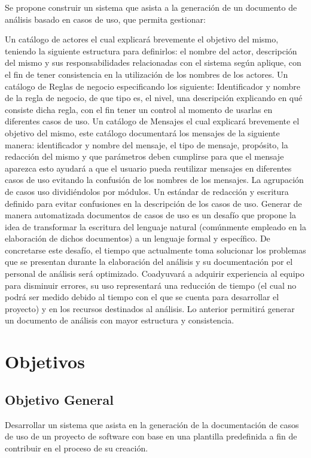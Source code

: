 	Se propone construir un sistema que asista a la generación de un documento de análisis basado en casos de uso,  que permita gestionar:
	
	Un catálogo de actores el cual explicará brevemente el objetivo del mismo, teniendo la siguiente estructura para definirlos: el nombre del actor, descripción del mismo y sus responsabilidades relacionadas con el sistema según aplique, con el fin de tener consistencia en la utilización de los nombres de los actores.
	Un catálogo de Reglas de negocio especificando los siguiente: Identificador y nombre de la regla de negocio, de que tipo es, el nivel, una descripción explicando en qué consiste dicha regla, con el fin tener un control al momento de usarlas en diferentes casos de uso.
	Un catálogo de Mensajes el cual explicará brevemente el objetivo del mismo, este catálogo documentará los mensajes de la siguiente manera: identificador y nombre del mensaje, el tipo de mensaje, propósito, la redacción del mismo y que parámetros deben cumplirse para que el mensaje aparezca esto ayudará a que el usuario pueda reutilizar mensajes en diferentes casos de uso evitando la confusión de los nombres de los mensajes.
	La agrupación de casos uso dividiéndolos por módulos.
	Un estándar de redacción y escritura definido para evitar confusiones en la descripción de los casos de uso.
	Generar de manera automatizada documentos de casos de uso es un desafío que propone la idea de transformar la escritura del lenguaje natural (comúnmente empleado en la elaboración de dichos documentos) a un lenguaje formal y específico. De concretarse este desafío, el tiempo que actualmente toma solucionar los problemas que se presentan durante la elaboración del análisis y su documentación por el  personal de análisis será optimizado. Coadyuvará a adquirir experiencia al equipo para  disminuir errores, su uso representará una reducción de tiempo (el cual no podrá ser medido debido al tiempo con el que se cuenta para desarrollar el proyecto)  y en los recursos destinados al análisis. Lo anterior permitirá generar un documento de análisis  con mayor estructura y consistencia.
	

\section{Objetivos}
\subsection{Objetivo General}
Desarrollar un sistema que asista en la generación de la documentación de casos de uso de un proyecto de software con base en una plantilla predefinida a fin de contribuir en el proceso de su creación.


